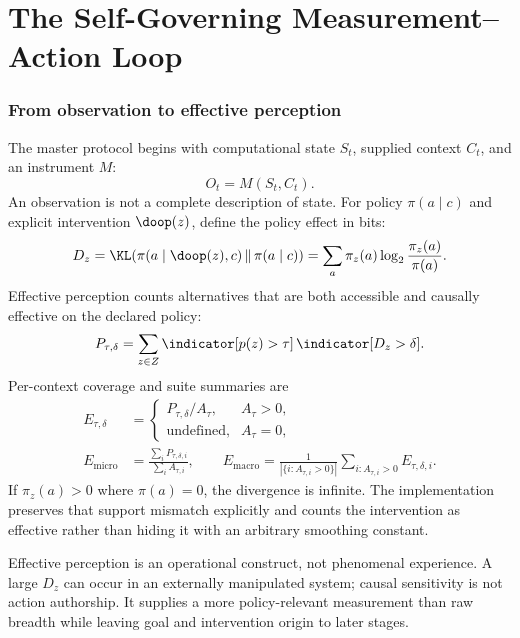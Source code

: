 \clearpage
\part{The Self-Governing Measurement--Action Loop}

\section{From observation to effective perception}
The master protocol begins with computational state $S_t$, supplied context $C_t$, and an instrument $M$:
\begin{equation}
O_t=M(S_t,C_t).
\label{eq:observation}
\end{equation}
An observation is not a complete description of state. For policy $\pi(a\mid c)$ and explicit intervention $\doop(z)$, define the policy effect in bits:
\begin{equation}
D_z=\KL\!\left(\pi(a\mid\doop(z),c)\,\middle\|\,\pi(a\mid c)\right)
=\sum_a\pi_z(a)\log_2\frac{\pi_z(a)}{\pi(a)}.
\label{eq:policy-effect}
\end{equation}
Effective perception counts alternatives that are both accessible and causally effective on the declared policy:
\begin{equation}
P_{\tau,\delta}=\sum_{z\in Z}\indicator[p(z)>\tau]\,\indicator[D_z>\delta].
\label{eq:effective-perception}
\end{equation}
Per-context coverage and suite summaries are
\begin{align}
E_{\tau,\delta}&=
\begin{cases}
P_{\tau,\delta}/A_\tau,&A_\tau>0,\\
\text{undefined},&A_\tau=0,
\end{cases}\\
E_{\mathrm{micro}}&=\frac{\sum_iP_{\tau,\delta,i}}{\sum_iA_{\tau,i}},
\qquad
E_{\mathrm{macro}}=\frac{1}{|\{i:A_{\tau,i}>0\}|}
\sum_{i:A_{\tau,i}>0}E_{\tau,\delta,i}.
\end{align}
If $\pi_z(a)>0$ where $\pi(a)=0$, the divergence is infinite. The implementation preserves that support mismatch explicitly and counts the intervention as effective rather than hiding it with an arbitrary smoothing constant.

Effective perception is an operational construct, not phenomenal experience. A large $D_z$ can occur in an externally manipulated system; causal sensitivity is not action authorship. It supplies a more policy-relevant measurement than raw breadth while leaving goal and intervention origin to later stages.

